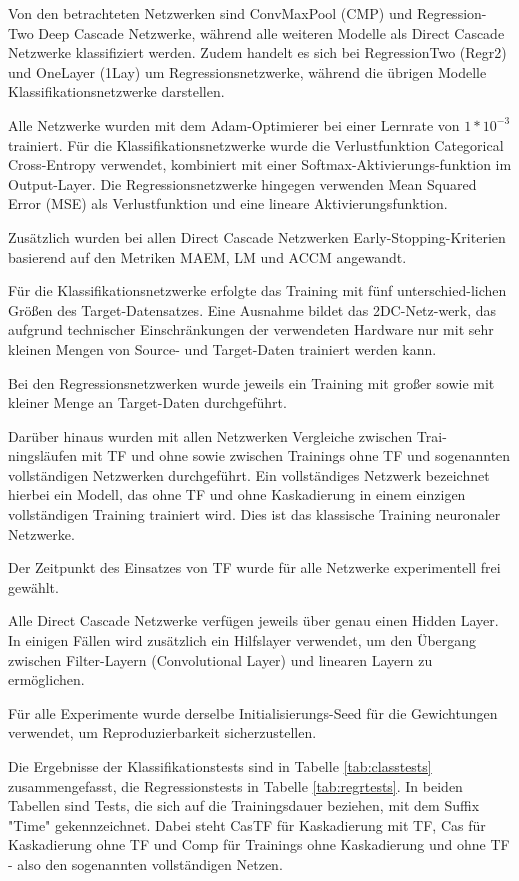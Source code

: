 Von den betrachteten Netzwerken sind ConvMaxPool (CMP) und Regression-Two Deep Cascade Netzwerke, während alle weiteren Modelle als 
Direct Cascade Netzwerke klassifiziert werden. Zudem handelt es sich bei RegressionTwo (Regr2) und OneLayer (1Lay) um Regressionsnetzwerke, während die übrigen 
Modelle Klassifikationsnetzwerke darstellen.

Alle Netzwerke wurden mit dem Adam-Optimierer bei einer Lernrate von $1*10^{-3}$ trainiert. Für die Klassifikationsnetzwerke wurde die 
Verlustfunktion Categorical Cross-Entropy verwendet, kombiniert mit einer Softmax-Aktivierungs-funktion im Output-Layer. Die 
Regressionsnetzwerke hingegen verwenden Mean Squared Error (MSE) als Verlustfunktion und eine lineare Aktivierungsfunktion.

Zusätzlich wurden bei allen Direct Cascade Netzwerken Early-Stopping-Kriterien basierend auf den Metriken MAEM, 
LM und ACCM angewandt.

Für die Klassifikationsnetzwerke erfolgte das Training mit fünf unterschied-lichen Größen des Target-Datensatzes. Eine 
Ausnahme bildet das 2DC-Netz-werk, das aufgrund technischer Einschränkungen der verwendeten Hardware nur mit sehr kleinen Mengen von Source- 
und Target-Daten trainiert werden kann.

Bei den Regressionsnetzwerken wurde jeweils ein Training mit großer sowie mit kleiner Menge an Target-Daten durchgeführt.

Darüber hinaus wurden mit allen Netzwerken Vergleiche zwischen Trai-ningsläufen mit TF und ohne sowie zwischen Trainings 
ohne TF und sogenannten vollständigen Netzwerken durchgeführt. Ein vollständiges Netzwerk bezeichnet hierbei ein Modell, das ohne TF 
und ohne Kaskadierung in einem einzigen vollständigen Training trainiert wird. Dies ist das klassische Training neuronaler Netzwerke. 

Der Zeitpunkt des Einsatzes von TF wurde für alle Netzwerke experimentell frei gewählt.

Alle Direct Cascade Netzwerke verfügen jeweils über genau einen Hidden Layer. In einigen Fällen wird zusätzlich ein Hilfslayer verwendet, um 
den Übergang zwischen Filter-Layern (Convolutional Layer) und linearen Layern zu ermöglichen.

Für alle Experimente wurde derselbe Initialisierungs-Seed für die Gewichtungen verwendet, um Reproduzierbarkeit sicherzustellen.

Die Ergebnisse der Klassifikationstests sind in Tabelle \ref{tab:classtests} zusammengefasst, die Regressionstests in Tabelle \ref{tab:regrtests}. 
In beiden Tabellen sind Tests, die sich auf die Trainingsdauer beziehen, mit dem Suffix "Time" gekennzeichnet. Dabei steht CasTF für Kaskadierung 
mit TF, Cas für Kaskadierung ohne TF und Comp für Trainings ohne Kaskadierung und ohne TF - 
also den sogenannten vollständigen Netzen. 

